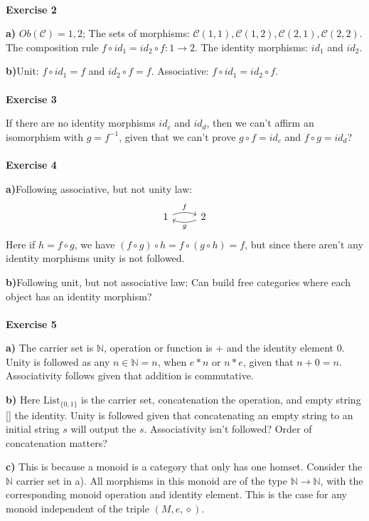 \documentclass[a4paper,12pt,twoside,leqno]{article}
\title{}
\author{}
\date{}
\begin{document}
\maketitle
{}
\paragraph*{}

\textbf{Exercise 2}\par 
\textbf{a)}
$Ob(\mathcal{C}) = {1, 2}$; The sets of morphisms: $\mathcal{C}(1,1), \mathcal{C}(1,2), \mathcal{C}(2,1), \mathcal{C}(2,2)$. The composition rule $f \circ id_{1} = id_{2} \circ f: 1 \rightarrow 2$. The identity morphisms: $id_{1}$ and $id_{2}$.\par 
\textbf{b)}Unit: $f \circ id_{1} = f$ and $id_{2} \circ f = f$. Associative: $f \circ id_{1} = id_{2} \circ f$.
\paragraph*{}
\textbf{Exercise 3}\par 
If there are no identity morphisms $id_{c}$ and $id_{d}$, then we can't affirm an isomorphism with $g = f^{-1}$, given that we can't prove $g \circ f = id_{c}$ and $f \circ g = id_{d}$?
\paragraph*{}
\textbf{Exercise 4}\par 
\textbf{a)}Following associative, but not unity law: 
$$
\begin{tikzcd}
  1  \arrow[r, "f", bend left=20] &\arrow[l, "g", bend left=20] 2 
\end{tikzcd}
$$
Here if $h = f \circ g$, we have $(f \circ g) \circ h = f \circ (g \circ h) = f$, but since there aren't any identity morphisms unity is not followed.\par
\textbf{b)}Following unit, but not associative law: Can build free categories where each object has an identity morphism?
\paragraph*{}
\textbf{Exercise 5}\par 
\textbf{a)} The carrier set is $\mathbb{N}$, operation or function is $+$ and the identity element $0$. Unity is followed as any $n \in \mathbb{N} = n$, when $e*n$ or $n*e$, given that $n + 0 = n$. Associativity follows given that addition is commutative.\par 
\textbf{b)} Here $\textrm{List}_{\{0, 1\}}$ is the carrier set, concatenation the operation, and empty string [] the identity. Unity is followed given that concatenating an empty string to an initial string $s$ will output the $s$. Associativity isn't followed? Order of concatenation matters?\par 
\textbf{c)} This is because a monoid is a category that only has one homset. Consider the $\mathbb{N}$ carrier set in a). All morphisms in this monoid are of the type $\mathbb{N} \rightarrow \mathbb{N}$, with the corresponding monoid operation and identity element. This is the case for any monoid independent of the triple $(M, e, \diamond)$.
\end{document}
